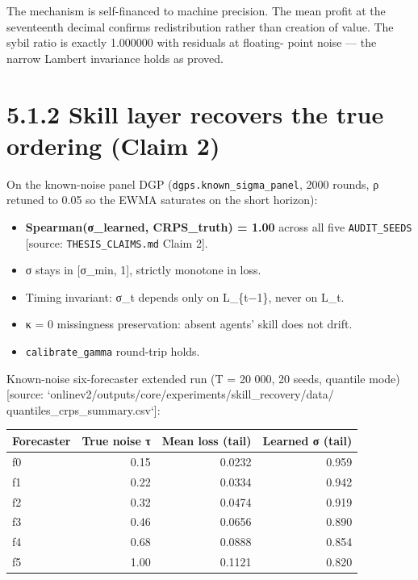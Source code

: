 \documentclass[11pt,a4paper,openany]{report}
\begin{document}
The mechanism is self-financed to machine precision. The mean profit at
the seventeenth decimal confirms redistribution rather than creation of
value. The sybil ratio is exactly 1.000000 with residuals at floating-
point noise — the narrow Lambert invariance holds as proved.

\section{5.1.2 Skill layer recovers the true ordering (Claim 2)}

On the known-noise panel DGP (\texttt{dgps.known\_sigma\_panel}, 2000 rounds, ρ
retuned to 0.05 so the EWMA saturates on the short horizon):

\begin{itemize}
  \item \textbf{Spearman(σ_learned, CRPS_truth) = 1.00} across all five
    \texttt{AUDIT\_SEEDS} [source: \texttt{THESIS\_CLAIMS.md} Claim 2].
  \item σ stays in [σ\_min, 1], strictly monotone in loss.
  \item Timing invariant: σ\_t depends only on L\_\{t−1\}, never on L\_t.
  \item κ = 0 missingness preservation: absent agents' skill does not drift.
  \item \texttt{calibrate\_gamma} round-trip holds.
\end{itemize}

Known-noise six-forecaster extended run (T = 20 000, 20 seeds,
quantile mode) [source:
`onlinev2/outputs/core/experiments/skill\_recovery/data/
quantiles\_crps\_summary.csv`]:

\begin{center}
\small
\begin{tabular}{lrrr}
\toprule
\textbf{Forecaster} & \textbf{True noise τ} & \textbf{Mean loss (tail)} & \textbf{Learned σ (tail)} \\
\midrule
f0 & 0.15 & 0.0232 & 0.959 \\
f1 & 0.22 & 0.0334 & 0.942 \\
f2 & 0.32 & 0.0474 & 0.919 \\
f3 & 0.46 & 0.0656 & 0.890 \\
f4 & 0.68 & 0.0888 & 0.854 \\
f5 & 1.00 & 0.1121 & 0.820 \\
\bottomrule
\end{tabular}
\end{center}
\end{document}
